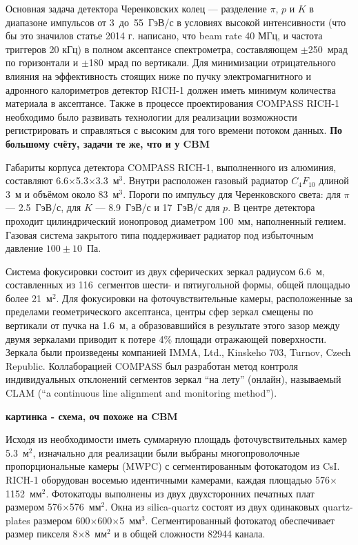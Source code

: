Основная задача детектора Черенковских колец --- разделение $\pi$, $p$ и $K$ в диапазоне импульсов от 3~до~55~ГэВ/с в условиях высокой интенсивности (что бы это значило\todo в статье 2014 г. написано, что beam rate 40 МГц, и частота триггеров 20 кГц) в полном аксептансе спектрометра, составляющем $\pm$250~мрад по горизонтали и $\pm$180~мрад по вертикали. Для минимизации отрицательного влияния на эффективность стоящих ниже по пучку электромагнитного и адронного калориметров детектор \mbox{RICH-1} должен иметь минимум количества материала в аксептансе. Также в процессе проектирования COMPASS \mbox{RICH-1} необходимо было развивать технологии для реализации возможности регистрировать и справляться с высоким для того времени потоком данных.
\todo \textbf{По большому счёту, задачи те же, что и у CBM}

Габариты корпуса детектора COMPASS \mbox{RICH-1}, выполненного из алюминия, составляют 6.6$\times$5.3$\times$3.3~м$^3$. Внутри расположен газовый радиатор $C_{4}F_{10}$ длиной 3~м и объёмом около 83~м$^3$. Пороги по импульсу для Черенковского света: для $\pi$ --- 2.5~ГэВ/с, для $K$ --- 8.9~ГэВ/с и 17~ГэВ/с для $p$. В центре детектора проходит цилиндрический ионопровод диаметром 100~мм, наполненный гелием.
Газовая система закрытого типа поддерживает радиатор под избыточным давление $100\pm10$~Па.

Система фокусировки состоит из двух сферических зеркал радиусом 6.6~м, составленных из 116~сегментов шести- и пятиугольной формы, общей площадью более 21~м$^2$. Для фокусировки на фоточувствительные камеры, расположенные за пределами геометрического аксептанса, центры сфер зеркал смещены по вертикали от пучка на 1.6~м, а образовавшийся в результате этого зазор между двумя зеркалами приводит к потере 4\% площади отражающей поверхности. Зеркала были произведены компанией IMMA, Ltd., Kinskeho 703, Turnov, Czech Republic.
Коллаборацией COMPASS был разработан метод контроля индивидуальных отклонений сегментов зеркал ``на лету'' (онлайн), называемый CLAM (``a continuous line alignment and monitoring method'').

\todo \textbf{картинка - схема, оч похоже на CBM}

Исходя из необходимости иметь суммарную площадь фоточувствительных камер 5.3~м$^2$, изначально для реализации были выбраны многопроволочные пропорциональные камеры (MWPC) с сегментированным фотокатодом из CsI. \mbox{RICH-1} оборудован восемью идентичными камерами, каждая площадью 576$\times$1152~мм$^2$. Фотокатоды выполнены из двух двухсторонних печатных плат размером 576$\times$576~мм$^2$. Окна из silica-quartz состоят из двух одинаковых quartz-plates размером 600$\times$600$\times$5~мм$^3$. Сегментированный фотокатод обеспечивает размер пикселя 8$\times$8~мм$^2$ и в общей сложности 82944 канала.

